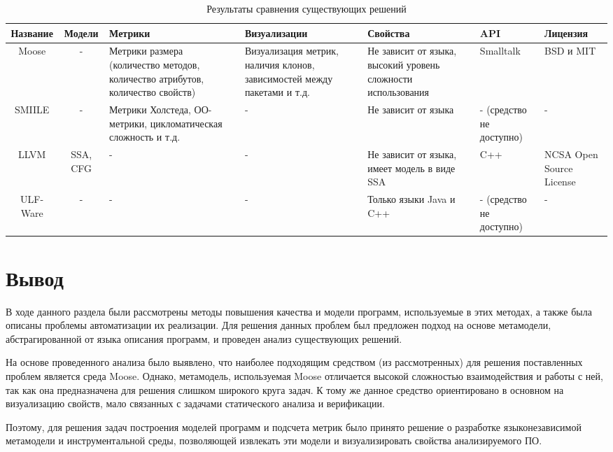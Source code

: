 \begin{sidewaystable}
\caption{Результаты сравнения существующих решений}
\scriptsize
\begin{tabularx}{\textwidth}{|c|c|X|X|X|X|X|}
\hline
Название & Модели & Метрики & Визуализации & Свойства & API & Лицензия \\ \hline
Moose & - & Метрики размера (количество методов, количество атрибутов, количество свойств) & Визуализация метрик, наличия клонов, зависимостей между пакетами и т.д. & Не зависит от языка, высокий уровень сложности использования & Smalltalk & BSD и MIT \\ \hline
SMIILE & - & Метрики Холстеда, ОО-метрики, цикломатическая сложность и т.д. & - & Не зависит от языка & - (средство не доступно) & - \\ \hline
LLVM & SSA, CFG & - & - & Не зависит от языка, имеет модель в виде SSA & C++ & NCSA Open Source License \\ \hline
ULF-Ware & - & - & - & Только языки Java и C++ & - (средство не доступно) & - \\ \hline
\end{tabularx}
\label{tab:results}
\end{sidewaystable}

\section{Вывод}

В ходе данного раздела были рассмотрены методы повышения качества и модели
программ, используемые в этих методах, а также была описаны проблемы
автоматизации их реализации. Для решения данных проблем был предложен подход на
основе метамодели, абстрагированной от языка описания программ, и проведен
анализ существующих решений.

На основе проведенного анализа было выявлено, что наиболее подходящим средством
(из рассмотренных) для решения поставленных проблем является среда Moose.
Однако, метамодель, используемая Moose отличается высокой сложностью
взаимодействия и работы с ней, так как она предназначена для решения слишком
широкого круга задач. К тому же данное средство ориентировано в основном на
визуализацию свойств, мало связанных с задачами статического анализа и
верификации.

Поэтому, для решения задач построения моделей программ и подсчета метрик было
принято решение о разработке языконезависимой метамодели и инструментальной
среды, позволяющей извлекать эти модели и визуализировать свойства
анализируемого ПО.
